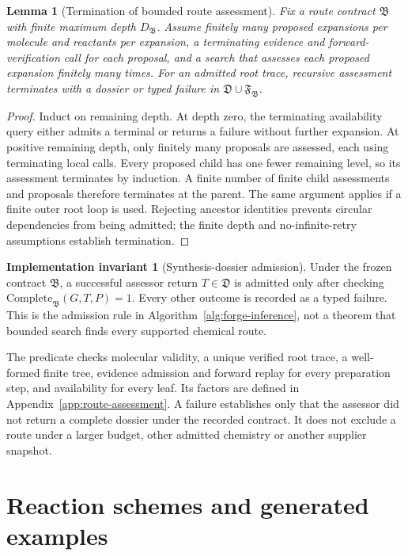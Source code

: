 \documentclass{article}
\newtheorem{lemma}[theorem]{Lemma}
\theoremstyle{definition}
\newtheorem{invariant}[theorem]{Implementation invariant}
\begin{document}
\begin{lemma}[Termination of bounded route assessment]
\label{lem:planner-termination}
Fix a route contract $\mathfrak B$ with finite maximum depth $D_{\mathfrak B}$. Assume finitely many
proposed expansions per molecule and reactants per expansion, a terminating evidence and
forward-verification call for each proposal, and a search that assesses each proposed expansion
finitely many times. For an admitted root trace, recursive assessment terminates with a dossier
or typed failure in $\mathfrak D\cup\mathfrak F_{\mathfrak B}$.
\end{lemma}
\begin{proof}
Induct on remaining depth. At depth zero, the terminating availability query either admits a
terminal or returns a failure without further expansion. At positive remaining depth, only finitely
many proposals are assessed, each using terminating local calls. Every proposed child has one
fewer remaining level, so its assessment terminates by induction. A finite number of finite child
assessments and proposals therefore terminates at the parent. The same argument applies if a
finite outer root loop is used. Rejecting ancestor identities prevents circular dependencies from
being admitted; the finite depth and no-infinite-retry assumptions establish termination.
\end{proof}

\begin{invariant}[Synthesis-dossier admission]
\label{inv:dossier-soundness}
Under the frozen contract $\mathfrak B$, a successful assessor return $T\in\mathfrak D$ is admitted
only after checking $\mathrm{Complete}_{\mathfrak B}(G,T,P)=1$. Every other outcome is recorded as
a typed failure. This is the admission rule in Algorithm~\ref{alg:forge-inference}, not a theorem
that bounded search finds every supported chemical route.
\end{invariant}
The predicate checks molecular validity, a unique verified root trace, a well-formed finite tree,
evidence admission and forward replay for every preparation step, and availability for every leaf.
Its factors are defined in Appendix~\ref{app:route-assessment}. A failure establishes only that the
assessor did not return a complete dossier under the recorded contract. It does not exclude a route
under a larger budget, other admitted chemistry or another supplier snapshot.

\clearpage

\section{Reaction schemes and generated examples}
\label{app:chemistry-examples}
\label{app:preliminaries}
\end{document}
